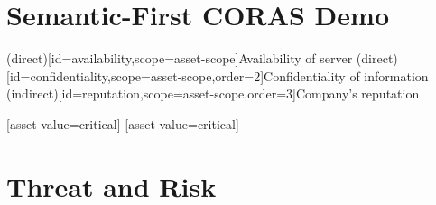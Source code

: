 \documentclass[a4paper]{article}
\begin{document}
\section*{Semantic-First CORAS Demo}

\begin{center}
\begin{corasassetdiagram}[x=.95cm,y=.95cm,asset columns=3]
  \asset(direct)[id=availability,scope=asset-scope]{Availability of server}
  \asset(direct)[id=confidentiality,scope=asset-scope,order=2]{Confidentiality of information}
  \asset(indirect)[id=reputation,scope=asset-scope,order=3]{Company's reputation}

  \corasscope[
    name=asset-box,
    scope=asset-scope,
    kind=asset-scope,
    party=company,
    party corner=left
  ]

  [asset value=critical]
  [asset value=critical]
\end{corasassetdiagram}
\end{center}

\newpage

\section*{Threat and Risk}
\end{document}

